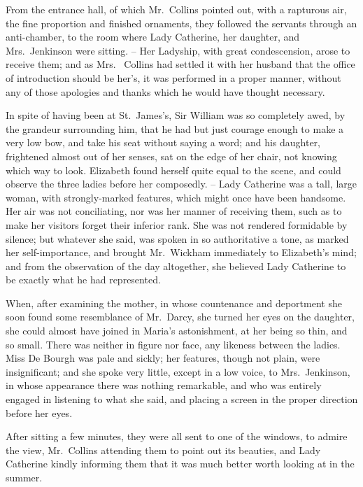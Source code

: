 From the entrance hall, of which Mr.\ Collins pointed
out, with a rapturous air, the fine proportion and finished
ornaments, they followed the servants through an anti-chamber,
to the room where Lady Catherine, her daughter,
and Mrs.\ Jenkinson were sitting. -- Her Ladyship, with
great condescension, arose to receive them; and as Mrs.\ %
Collins had settled it with her husband that the office of
introduction should be her’s, it was performed in a proper
manner, without any of those apologies and thanks which
he would have thought necessary.

In spite of having been at St.\ James’s, Sir William was
so completely awed, by the grandeur surrounding him, that
he had but just courage enough to make a very low bow,
and take his seat without saying a word; and his daughter,
frightened almost out of her senses, sat on the edge of her
chair, not knowing which way to look. Elizabeth found
herself quite equal to the scene, and could observe the three
ladies before her composedly. -- Lady Catherine was a tall,
large woman, with strongly-marked features, which might
once have been handsome. Her air was not conciliating, nor
was her manner of receiving them, such as to make her
visitors forget their inferior rank. She was not rendered
formidable by silence; but whatever she said, was spoken
in so authoritative a tone, as marked her self-importance,
and brought Mr.\ Wickham immediately to Elizabeth’s
mind; and from the observation of the day altogether,
she believed Lady Catherine to be exactly what he had
represented.

When, after examining the mother, in whose countenance
and deportment she soon found some resemblance
of Mr.\ Darcy, she turned her eyes on the daughter, she
could almost have joined in Maria’s astonishment, at her
being so thin, and so small. There was neither in figure
nor face, any likeness between the ladies. Miss De Bourgh
was pale and sickly; her features, though not plain, were
insignificant; and she spoke very little, except in a low
voice, to Mrs.\ Jenkinson, in whose appearance there was
nothing remarkable, and who was entirely engaged in
listening to what she said, and placing a screen in the
proper direction before her eyes.

After sitting a few minutes, they were all sent to one
of the windows, to admire the view, Mr.\ Collins attending
them to point out its beauties, and Lady Catherine kindly
informing them that it was much better worth looking at
in the summer.

